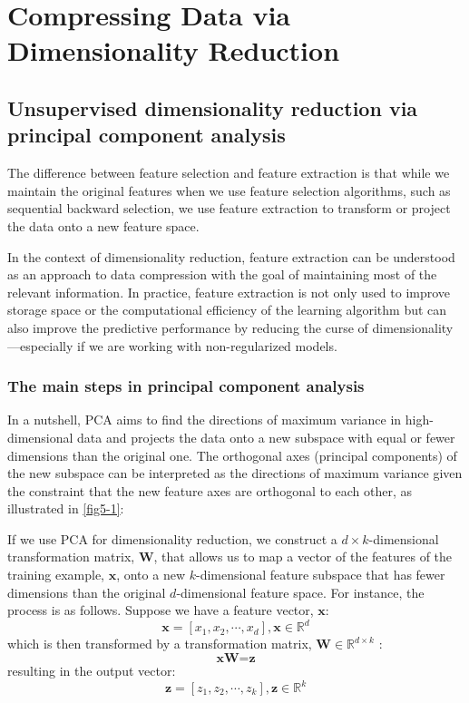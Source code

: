 \chapter{Compressing Data via Dimensionality Reduction\label{Ch05}}
\section{Unsupervised dimensionality reduction via principal component analysis}
The difference between feature selection and feature extraction is that while we maintain the original features when we use feature selection algorithms, such as sequential backward selection, we use feature extraction to transform or project the data onto a new feature space.

In the context of dimensionality reduction, feature extraction can be understood as an approach to data compression with the goal of maintaining most of the relevant information. In practice, feature extraction is not only used to improve storage space or the computational efficiency of the learning algorithm but can also improve the predictive performance by reducing the curse of dimensionality—especially if we are working with non-regularized models.
\subsection{The main steps in principal component analysis}
In a nutshell, PCA aims to find the directions of maximum variance in high-dimensional data and projects the data onto a new subspace with equal or fewer dimensions than the original one. The orthogonal axes (principal components) of the new subspace can be interpreted as the directions of maximum variance given the constraint that the new feature axes are orthogonal to each other, as illustrated in \autoref{fig5-1}:

If we use PCA for dimensionality reduction, we construct a $d\times k$-dimensional transformation matrix, \textbf{W}, that allows us to map a vector of the features of the training example, $\textbf{x}$, onto a new $k$-dimensional feature subspace that has fewer dimensions than the original $d$-dimensional feature space. For instance, the process is as follows. Suppose we have a feature vector, $\textbf{x}$:
$$\textbf{x}=[x_1,x_2, \cdots, x_d], \textbf{x}\in \mathbb{R}^d$$
which is then transformed by a transformation matrix, $\textbf{W}\in \mathbb{R}^{d\times k}$ :
$$\textbf{x}\textbf{W}=\textbf{z}$$
resulting in the output vector:
$$\textbf{z}=[z_1,z_2, \cdots, z_k], \textbf{z}\in \mathbb{R}^k$$

